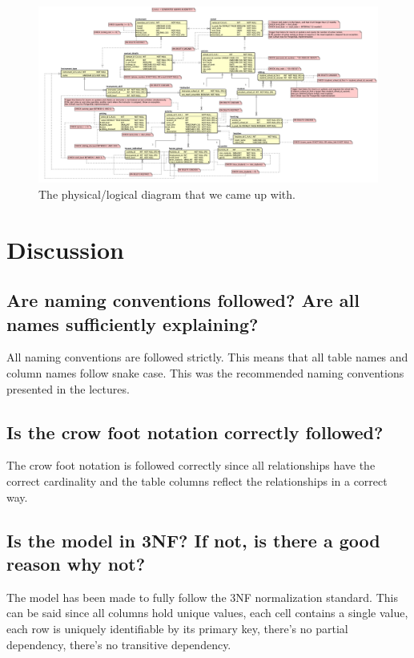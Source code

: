\documentclass[a4paper]{scrartcl}
\begin{document}
\begin{figure}[H]
  \begin{center}
    \includegraphics[scale=0.18]{Diagram Picture.png}
    \caption{The physical/logical diagram that we came up with.}
    \label{fig:diag}
  \end{center}
\end{figure}

\section{Discussion}

\subsection{Are naming conventions followed? Are all names sufficiently explaining?}
All naming conventions are followed strictly. This means that all table names and column names follow snake case. This was the recommended naming conventions presented in the lectures.

\subsection{Is the crow foot notation correctly followed?}
The crow foot notation is followed correctly since all relationships have the correct cardinality and the table columns reflect the relationships in a correct way.

\subsection{Is the model in 3NF? If not, is there a good reason why not?}
The model has been made to fully follow the 3NF normalization standard. This can be said since all columns hold unique values, each cell contains a single value, each row is uniquely identifiable by its primary key, there's no partial dependency, there's no transitive dependency.
\end{document}
